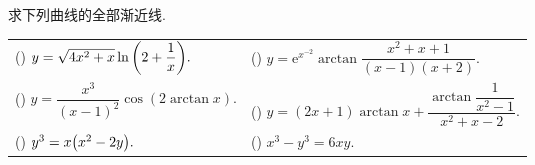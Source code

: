 \begin{example}
    求下列曲线的全部渐近线.
    \setcounter{magicrownumbers}{0}
    \begin{table}[H]
        \centering
        \begin{tabular}{l | l}
            (\rownumber{}) $y=\sqrt{4x^2+x}\ln\qty(2+\dfrac{1}{x}).$ & (\rownumber{}) $y=\mathrm{e}^{x^{-2}}\arctan\dfrac{x^2+x+1}{(x-1)(x+2)}.$                  \\
            (\rownumber{}) $y=\dfrac{x^3}{(x-1)^2}\cos(2\arctan x).$ & (\rownumber{}) $\displaystyle y=(2x+1)\arctan x+\dfrac{\arctan\dfrac{1}{x^2-1}}{x^2+x-2}.$ \\
            (\rownumber{}) $y^3=x\qty(x^2-2y).$                      & (\rownumber{}) $x^3-y^3=6xy.$
        \end{tabular}
    \end{table}
\end{example}
